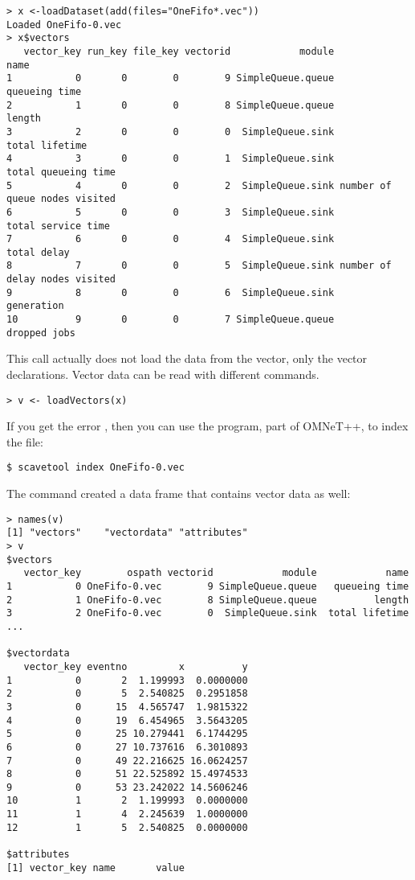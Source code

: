 \begin{verbatim}
> x <-loadDataset(add(files="OneFifo*.vec"))
Loaded OneFifo-0.vec
> x$vectors
   vector_key run_key file_key vectorid            module                          name
1           0       0        0        9 SimpleQueue.queue                 queueing time
2           1       0        0        8 SimpleQueue.queue                        length
3           2       0        0        0  SimpleQueue.sink                total lifetime
4           3       0        0        1  SimpleQueue.sink           total queueing time
5           4       0        0        2  SimpleQueue.sink number of queue nodes visited
6           5       0        0        3  SimpleQueue.sink            total service time
7           6       0        0        4  SimpleQueue.sink                   total delay
8           7       0        0        5  SimpleQueue.sink number of delay nodes visited
9           8       0        0        6  SimpleQueue.sink                    generation
10          9       0        0        7 SimpleQueue.queue                  dropped jobs
\end{verbatim}

This call actually does not load the data from the vector, only the vector declarations. 
Vector data can be read with different commands.

\begin{verbatim}
> v <- loadVectors(x)
\end{verbatim}

If you get the error , then
you can use the  program, part of OMNeT++, to index the file: 

\begin{verbatim}
$ scavetool index OneFifo-0.vec
\end{verbatim}

The  command created a data frame that contains vector data as well:

\begin{verbatim}
> names(v)
[1] "vectors"    "vectordata" "attributes"
> v
$vectors
   vector_key        ospath vectorid            module            name
1           0 OneFifo-0.vec        9 SimpleQueue.queue   queueing time
2           1 OneFifo-0.vec        8 SimpleQueue.queue          length
3           2 OneFifo-0.vec        0  SimpleQueue.sink  total lifetime
...

$vectordata
   vector_key eventno         x          y
1           0       2  1.199993  0.0000000
2           0       5  2.540825  0.2951858
3           0      15  4.565747  1.9815322
4           0      19  6.454965  3.5643205
5           0      25 10.279441  6.1744295
6           0      27 10.737616  6.3010893
7           0      49 22.216625 16.0624257
8           0      51 22.525892 15.4974533
9           0      53 23.242022 14.5606246
10          1       2  1.199993  0.0000000
11          1       4  2.245639  1.0000000
12          1       5  2.540825  0.0000000

$attributes
[1] vector_key name       value     
\end{verbatim}

